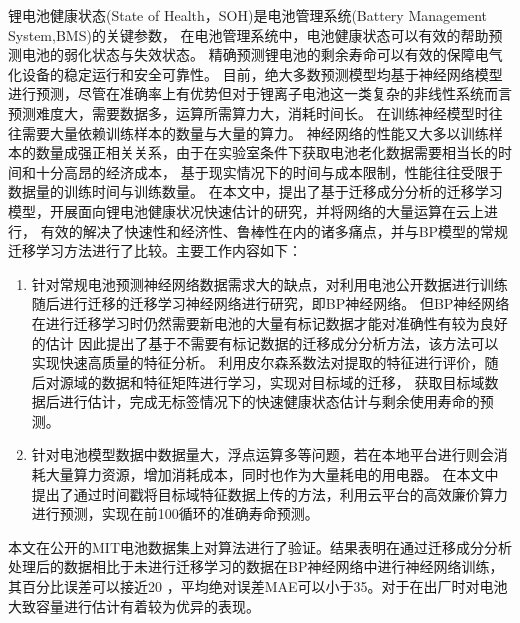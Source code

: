 \begin{cnabstract}

锂电池健康状态(State of Health，SOH)是电池管理系统(Battery Management System,BMS)的关键参数，
在电池管理系统中，电池健康状态可以有效的帮助预测电池的弱化状态与失效状态。
精确预测锂电池的剩余寿命可以有效的保障电气化设备的稳定运行和安全可靠性。
目前，绝大多数预测模型均基于神经网络模型进行预测，尽管在准确率上有优势但对于锂离子电池这一类复杂的非线性系统而言预测难度大，需要数据多，运算所需算力大，消耗时间长。
在训练神经模型时往往需要大量依赖训练样本的数量与大量的算力。
神经网络的性能又大多以训练样本的数量成强正相关关系，由于在实验室条件下获取电池老化数据需要相当长的时间和十分高昂的经济成本，
基于现实情况下的时间与成本限制，性能往往受限于数据量的训练时间与训练数量。
在本文中，提出了基于迁移成分分析的迁移学习模型，开展面向锂电池健康状况快速估计的研究，并将网络的大量运算在云上进行，
有效的解决了快速性和经济性、鲁棒性在内的诸多痛点，并与BP模型的常规迁移学习方法进行了比较。主要工作内容如下：
\begin{enumerate}

    \item 针对常规电池预测神经网络数据需求大的缺点，对利用电池公开数据进行训练随后进行迁移的迁移学习神经网络进行研究，即BP神经网络。
          但BP神经网络在进行迁移学习时仍然需要新电池的大量有标记数据才能对准确性有较为良好的估计
          因此提出了基于不需要有标记数据的迁移成分分析方法，该方法可以实现快速高质量的特征分析。
          利用皮尔森系数法对提取的特征进行评价，随后对源域的数据和特征矩阵进行学习，实现对目标域的迁移，
          获取目标域数据后进行估计，完成无标签情况下的快速健康状态估计与剩余使用寿命的预测。
    \item 针对电池模型数据中数据量大，浮点运算多等问题，若在本地平台进行则会消耗大量算力资源，增加消耗成本，同时也作为大量耗电的用电器。
          在本文中提出了通过时间戳将目标域特征数据上传的方法，利用云平台的高效廉价算力进行预测，实现在前100循环的准确寿命预测。
    
\end{enumerate}

本文在公开的MIT电池数据集上对算法进行了验证。结果表明在通过迁移成分分析处理后的数据相比于未进行迁移学习的数据在BP神经网络中进行神经网络训练，其百分比误差可以接近20%
，平均绝对误差MAE可以小于35。对于在出厂时对电池大致容量进行估计有着较为优异的表现。



\end{cnabstract}

